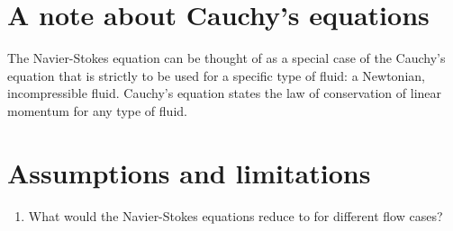\section{A note about Cauchy's equations}

The Navier-Stokes equation can be thought of as a special case of the Cauchy's equation that is strictly to be used for a specific type of fluid: a Newtonian, incompressible fluid. Cauchy's equation states the law of conservation of linear momentum for any type of fluid. 


\section{Assumptions and limitations}



\newpage


\begin{enumerate}

\item What would the Navier-Stokes equations reduce to for different flow cases?

\end{enumerate}
